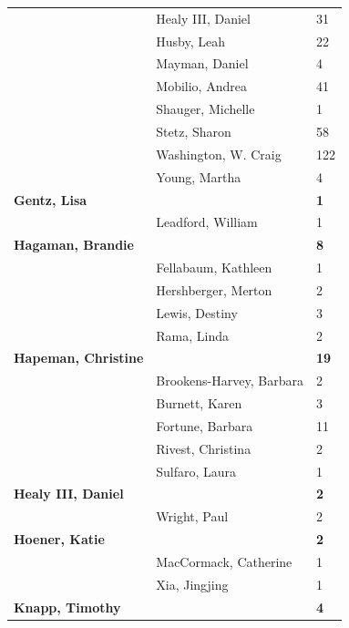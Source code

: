 \documentclass{article}\usepackage[]{graphicx}\usepackage[]{color}
\begin{document}
{\begin{longtable} { >{\raggedright}p{}|p{}p{}}
   \rowcolor[gray]{0.90} & Healy III, Daniel & 31 \\ 
   \rowcolor[gray]{0.90} & Husby, Leah & 22 \\ 
   & Mayman, Daniel & 4 \\ 
   & Mobilio, Andrea & 41 \\ 
   & Shauger, Michelle & 1 \\ 
   \rowcolor[gray]{0.90} & Stetz, Sharon & 58 \\ 
   \rowcolor[gray]{0.90} & Washington, W. Craig & 122 \\ 
   \rowcolor[gray]{0.90} & Young, Martha & 4 \\ 
  \textbf{Gentz, Lisa} &  & \hspace{2cm}\textbf{1} \\ 
   & Leadford, William & 1 \\ 
  \textbf{Hagaman, Brandie} &  & \hspace{2cm}\textbf{8} \\ 
   \rowcolor[gray]{0.90} & Fellabaum, Kathleen & 1 \\ 
   \rowcolor[gray]{0.90} & Hershberger, Merton & 2 \\ 
   \rowcolor[gray]{0.90} & Lewis, Destiny & 3 \\ 
   & Rama, Linda & 2 \\ 
  \textbf{Hapeman, Christine} &  & \hspace{2cm}\textbf{19} \\ 
   & Brookens-Harvey, Barbara & 2 \\ 
   \rowcolor[gray]{0.90} & Burnett, Karen & 3 \\ 
   \rowcolor[gray]{0.90} & Fortune, Barbara & 11 \\ 
   \rowcolor[gray]{0.90} & Rivest, Christina & 2 \\ 
   & Sulfaro, Laura & 1 \\ 
  \textbf{Healy III, Daniel} &  & \hspace{2cm}\textbf{2} \\ 
   & Wright, Paul & 2 \\ 
   \rowcolor[gray]{0.90}\textbf{Hoener, Katie} &  & \hspace{2cm}\textbf{2} \\ 
   \rowcolor[gray]{0.90} & MacCormack, Catherine & 1 \\ 
   \rowcolor[gray]{0.90} & Xia, Jingjing & 1 \\ 
  \textbf{Knapp, Timothy} &  & \hspace{2cm}\textbf{4} \\ 

\end{longtable}}
\end{document}
